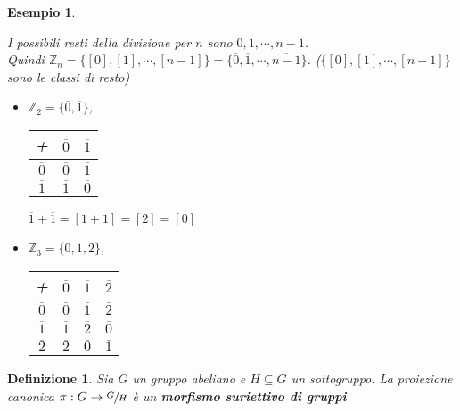 \documentclass[a4paper,12pt]{article}
\theoremstyle{def}
\newtheorem*{definition}{Definizione}
\theoremstyle{prop}
\theoremstyle{esempio}
\newtheorem*{example}{Esempio}
\theoremstyle{dimostrazione}
\theoremstyle{teo}
\theoremstyle{osservazione}
\begin{document}
\begin{example}
\begin{itemize}
		      I possibili resti della divisione
		      per \(n\) sono \(0,1,\cdots,n-1\).\\
		      Quindi \(\mathbb{Z}_n = \{[0],[1],\cdots,[n-1]\} = \{\overline{0}, \overline{1},\cdots,\overline{n - 1}\}\).
		      (\(\{[0],[1],\cdots,[n-1]\}\) sono le classi di resto)
		      \
		      \begin{itemize}
			      \item \(\mathbb{Z}_2 = \{\overline{0},\overline{1}\}\),
			            \begin{table}[htbp]
				            \centering
				            \begin{tabular}{|c|c|c|}
					            \hline
					            +                & \(\overline{0}\) & \(\overline{1}\) \\ \hline
					            \(\overline{0}\) & \(\overline{0}\) & \(\overline{1}\) \\ \hline
					            \(\overline{1}\) & \(\overline{1}\) & \(\overline{0}\) \\ \hline
				            \end{tabular}
			            \end{table}
			            \(\overline{1} + \overline{1} = [1 + 1] = [2] = [0]\)
			      \item \(\mathbb{Z}_3 = \{\overline{0},\overline{1},\overline{2}\}\),
			            \begin{table}[htbp]
				            \centering
				            \begin{tabular}{|c|c|c|c|}
					            \hline
					            +                & \(\overline{0}\) & \(\overline{1}\) & \(\overline{2}\) \\ \hline
					            \(\overline{0}\) & \(\overline{0}\) & \(\overline{1}\) & \(\overline{2}\) \\ \hline
					            \(\overline{1}\) & \(\overline{1}\) & \(\overline{2}\) & \(\overline{0}\) \\ \hline
					            \(\overline{2}\) & \(\overline{2}\) & \(\overline{0}\) & \(\overline{1}\) \\ \hline
				            \end{tabular}
			            \end{table}
		      \end{itemize}
	\end{itemize}
\end{example}


\begin{definition}
	Sia \(G\) un gruppo abeliano e \(H \subseteq G\) un sottogruppo. La proiezione canonica \(\pi : G \rightarrow \sfrac{G}{H}\)
	è un \textbf{morfismo suriettivo di gruppi}
\end{definition}
\end{document}
